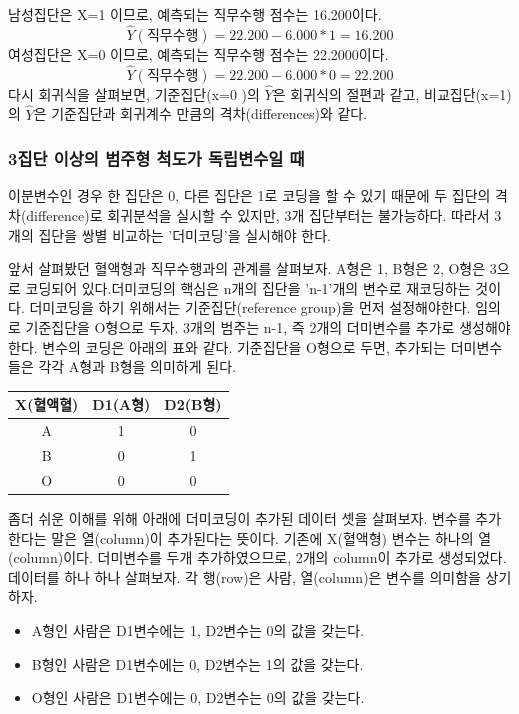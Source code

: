 \documentclass[
]{book}
\providecommand{\tightlist}{%
  \setlength{\itemsep}{0pt}\setlength{\parskip}{0pt}}
\begin{document}
남성집단은 X=1 이므로, 예측되는 직무수행 점수는 16.200이다.\\
\[\hat{Y}(직무수행) = 22.200-6.000 \ast 1 = 16.200 \]
여성집단은 X=0 이므로, 예측되는 직무수행 점수는 22.2000이다.
\[\hat{Y}(직무수행) = 22.200-6.000 \ast 0 = 22.200 \]
다시 회귀식을 살펴보면, 기준집단(x=0 )의 \(\hat{Y}\)은 회귀식의 절편과 같고, 비교집단(x=1)의 \(\hat{Y}\)은 기준집단과 회귀계수 만큼의 격차(differences)와 같다.

\subsubsection{3집단 이상의 범주형 척도가 독립변수일 때}\label{uxc9d1uxb2e8-uxc774uxc0c1uxc758-uxbc94uxc8fcuxd615-uxcc99uxb3c4uxac00-uxb3c5uxb9bduxbcc0uxc218uxc77c-uxb54c}

이분변수인 경우 한 집단은 0, 다른 집단은 1로 코딩을 할 수 있기 때문에 두 집단의 격차(difference)로 회귀분석을 실시할 수 있지만, 3개 집단부터는 불가능하다. 따라서 3개의 집단을 쌍별 비교하는 '더미코딩'을 실시해야 한다.

앞서 살펴봤던 혈액형과 직무수행과의 관계를 살펴보자. A형은 1, B형은 2, O형은 3으로 코딩되어 있다.더미코딩의 핵심은 n개의 집단을 'n-1'개의 변수로 재코딩하는 것이다. 더미코딩을 하기 위해서는 기준집단(reference group)을 먼저 설정해야한다. 임의로 기준집단을 O형으로 두자. 3개의 범주는 n-1, 즉 2개의 더미변수를 추가로 생성해야 한다. 변수의 코딩은 아래의 표와 같다. 기준집단을 O형으로 두면, 추가되는 더미변수들은 각각 A형과 B형을 의미하게 된다.

\begin{longtable}[]{@{}ccc@{}}
\toprule\noalign{}
X(혈액혈) & D1(A형) & D2(B형) \\
\midrule\noalign{}
\endhead
\bottomrule\noalign{}
\endlastfoot
A & 1 & 0 \\
B & 0 & 1 \\
O & 0 & 0 \\
\end{longtable}

좀더 쉬운 이해를 위해 아래에 더미코딩이 추가된 데이터 셋을 살펴보자. 변수를 추가 한다는 말은 열(column)이 추가된다는 뜻이다. 기존에 X(혈액형) 변수는 하나의 열(column)이다. 더미변수를 두개 추가하였으므로, 2개의 column이 추가로 생성되었다. 데이터를 하나 하나 살펴보자. 각 행(row)은 사람, 열(column)은 변수를 의미함을 상기하자.

\begin{itemize}
\tightlist
\item
  A형인 사람은 D1변수에는 1, D2변수는 0의 값을 갖는다.
\item
  B형인 사람은 D1변수에는 0, D2변수는 1의 값을 갖는다.
\item
  O형인 사람은 D1변수에는 0, D2변수는 0의 값을 갖는다.
\end{itemize}
\end{document}
